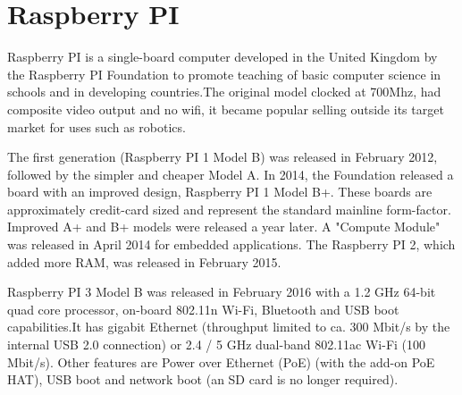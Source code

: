 \section{Raspberry PI}
Raspberry PI is a single-board computer developed in the United Kingdom by the Raspberry PI Foundation to promote teaching of basic computer science in schools and in developing countries.The original model clocked at 700Mhz, had composite video output and no wifi, it became popular selling outside its target market for uses such as robotics. 

The first generation (Raspberry PI 1 Model B) was released in February 2012, followed by the simpler and cheaper Model A. In 2014, the Foundation released a board with an improved design, Raspberry PI 1 Model B+. These boards are approximately credit-card sized and represent the standard mainline form-factor. Improved A+ and B+ models were released a year later. A "Compute Module" was released in April 2014 for embedded applications. The Raspberry PI 2, which added more RAM, was released in February 2015.

Raspberry PI 3 Model B was released in February 2016 with a 1.2 GHz 64-bit quad core processor, on-board 802.11n Wi-Fi, Bluetooth and USB boot capabilities.It has gigabit Ethernet (throughput limited to ca. 300 Mbit/s by the internal USB 2.0 connection) or 2.4 / 5 GHz dual-band 802.11ac Wi-Fi (100 Mbit/s). Other features are Power over Ethernet (PoE) (with the add-on PoE HAT), USB boot and network boot (an SD card is no longer required).

